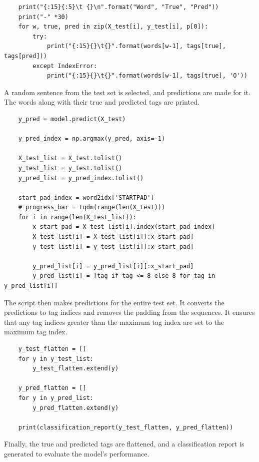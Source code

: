 \documentclass{solutionclass} %
\begin{document}
\begin{solution}
\begin{lstlisting}
    print("{:15}{:5}\t {}\n".format("Word", "True", "Pred"))
    print("-" *30)
    for w, true, pred in zip(X_test[i], y_test[i], p[0]):
        try:
            print("{:15}{}\t{}".format(words[w-1], tags[true], tags[pred]))
        except IndexError:
            print("{:15}{}\t{}".format(words[w-1], tags[true], 'O'))
    \end{lstlisting}
    
    A random sentence from the test set is selected, and predictions are made for it. The words along with their true and predicted tags are printed.
    
    \begin{lstlisting}
    y_pred = model.predict(X_test)
    
    y_pred_index = np.argmax(y_pred, axis=-1)
    
    X_test_list = X_test.tolist()
    y_test_list = y_test.tolist()
    y_pred_list = y_pred_index.tolist()
    
    start_pad_index = word2idx['STARTPAD']
    # progress_bar = tqdm(range(len(X_test)))
    for i in range(len(X_test_list)):
        x_start_pad = X_test_list[i].index(start_pad_index)
        X_test_list[i] = X_test_list[i][:x_start_pad]
        y_test_list[i] = y_test_list[i][:x_start_pad]
        
        y_pred_list[i] = y_pred_list[i][:x_start_pad]
        y_pred_list[i] = [tag if tag <= 8 else 8 for tag in y_pred_list[i]]
    \end{lstlisting}
    
    The script then makes predictions for the entire test set. It converts the predictions to tag indices and removes the padding from the sequences. It ensures that any tag indices greater than the maximum tag index are set to the maximum tag index.
    
    \begin{lstlisting}
    y_test_flatten = []
    for y in y_test_list:
        y_test_flatten.extend(y)
    
    y_pred_flatten = []
    for y in y_pred_list:
        y_pred_flatten.extend(y)
    
    print(classification_report(y_test_flatten, y_pred_flatten))
    \end{lstlisting}
    
    Finally, the true and predicted tags are flattened, and a classification report is generated to evaluate the model's performance.
    
\end{solution}
\end{document}
